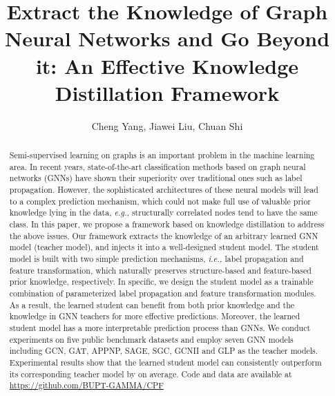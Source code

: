\documentclass[sigconf]{acmart}
\begin{document}
\title{Extract the Knowledge of Graph Neural Networks and Go Beyond it: An Effective Knowledge Distillation Framework}

\author{
Cheng Yang, Jiawei Liu, Chuan Shi}
\renewcommand{\shortauthors}{Cheng Yang, Jiawei Liu and Chuan Shi}

\renewcommand{\algorithmicrequire}{\textbf{Input:}}
\renewcommand{\algorithmicensure}{\textbf{Output:}}
\begin{abstract}

Semi-supervised learning on graphs is an important problem in the machine learning area. In recent years, state-of-the-art classification methods based on graph neural networks (GNNs) have shown their superiority over traditional ones such as label propagation. However, the sophisticated architectures of these neural models will lead to a complex prediction mechanism, which could not make full use of valuable prior knowledge lying in the data, \textit{e.g.}, structurally correlated nodes tend to have the same class. 
In this paper, we propose a framework based on knowledge distillation to address the above issues. Our framework extracts the knowledge of an arbitrary learned GNN model (teacher model), and injects it into a well-designed student model. The student model is built with two simple prediction mechanisms, \textit{i.e.,} label propagation and feature transformation, which naturally preserves structure-based and feature-based prior knowledge, respectively. In specific, we design the student model as a trainable combination of parameterized label propagation and feature transformation modules. As a result, the learned student can benefit from both prior knowledge and the knowledge in GNN teachers for more effective predictions. Moreover, the learned student model has a more interpretable prediction process than GNNs. We conduct experiments on five public benchmark datasets and employ seven GNN models including GCN, GAT, APPNP, SAGE, SGC, GCNII and GLP as the teacher models. Experimental results show that the learned student model can consistently outperform its corresponding teacher model by  on average. Code and data are available at \url{https://github.com/BUPT-GAMMA/CPF}\end{abstract}
\end{document}
